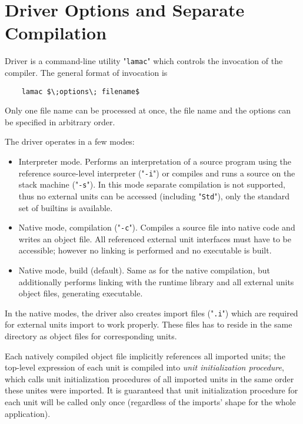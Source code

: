 \chapter{Driver Options and Separate Compilation}
\label{sec:driver}

Driver is a command-line utility "\texttt{lamac}" which controls the invocation of the compiler. The
general format of invocation is

\begin{lstlisting}
    lamac $\;options\; filename$
\end{lstlisting}

Only one file name can be processed at once, the file name and the options can be specified in
arbitrary order.

The driver operates in a few modes:

\begin{itemize}
\item Interpreter mode. Performs an interpretation of a source program using the reference source-level interpreter ("\texttt{-i}") or
  compiles and runs a source on the stack machine ("\texttt{-s}"). In this mode separate compilation is not supported, thus no external
  units can be accessed (including "\lstinline|Std|"), only the standard set of builtins is available. 
\item Native mode, compilation ("\lstinline{-c}"). Compiles a source file into native code and writes an object file. All referenced
  external unit interfaces must have to be accessible; however no linking is performed and no executable is built.
\item Native mode, build (default). Same as for the native compilation, but additionally performs linking with the runtime library and
  all external units object files, generating executable.
\end{itemize}

In the native modes, the driver also creates import files ("\texttt{.i}") which are required for external units import to
work properly. These files has to reside in the same directory as object files for corresponding units.

Each natively compiled object file implicitly references all imported units; the top-level expression of each
unit is compiled into \emph{unit initialization procedure}, which calls unit initialization procedures of
all imported units in the same order these unites were imported. It is guaranteed that unit initialization
procedure for each unit will be called only once (regardless of the imports' shape for the whole application).

